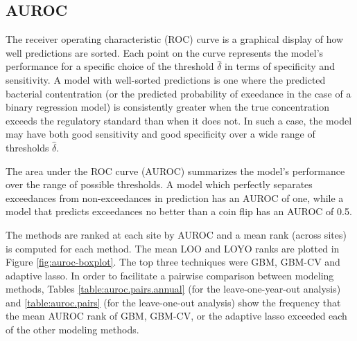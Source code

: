 \documentclass{article}\usepackage[]{graphicx}\usepackage[]{color}
\numberwithin{equation}{section}
\numberwithin{figure}{section}
\renewcommand\[{\begin{equation}}
\renewcommand\]{\end{equation}}
\begin{document}
\subsection{AUROC}

The receiver operating characteristic (ROC) curve is a graphical display
of how well predictions are sorted. Each point on the curve represents
the model's performance for a specific choice of the threshold $\hat{\delta}$
in terms of specificity and sensitivity. A model with well-sorted
predictions is one where the predicted bacterial contentration (or
the predicted probability of exeedance in the case of a binary regression
model) is consistently greater when the true concentration exceeds
the regulatory standard than when it does not. In such a case, the
model may have both good sensitivity and good specificity over a wide
range of thresholds $\hat{\delta}$.

The area under the ROC curve (AUROC) summarizes the model's performance
over the range of possible thresholds. A model which perfectly separates
exceedances from non-exceedances in prediction has an AUROC of one,
while a model that predicts exceedances no better than a coin flip
has an AUROC of 0.5.

The methods are ranked at each site by AUROC and a mean rank (across
sites) is computed for each method. The mean LOO and LOYO ranks are
plotted in Figure \ref{fig:auroc-boxplot}. The top three techniques
were GBM, GBM-CV and adaptive lasso. In order to facilitate a pairwise
comparison between modeling methods, Tables \ref{table:auroc.pairs.annual}
(for the leave-one-year-out analysis) and \ref{table:auroc.pairs}
(for the leave-one-out analysis) show the frequency that the mean
AUROC rank of GBM, GBM-CV, or the adaptive lasso exceeded each of
the other modeling methods.
\end{document}
